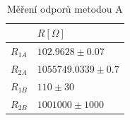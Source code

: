 \documentclass[a4paper,11pt]{article}
\begin{document}
    \paragraph{}
    \paragraph{}
    \paragraph{}
    \paragraph{}

        \begin{table}[h]
            \centering
            \begin{tabular}{ | l | l | }
                \hline
                         & $R [\Omega]$      \\ \hline
                $R_{1A}$ & $102.9628 \pm 0.07$    \\ \hline
                $R_{2A}$ & $1055749.0339 \pm 0.7$  \\ \hline
                $R_{1B}$ & $110 \pm 30$           \\ \hline
                $R_{2B}$ & $1001000 \pm 1000$     \\
                \hline
            \end{tabular}
            \caption{Měření odporů metodou A}
            \label{fig:method_b}
        \end{table}
    
    \paragraph{}
    \paragraph{}
    \paragraph{}
    \paragraph{}
    \paragraph{}
\end{document}
